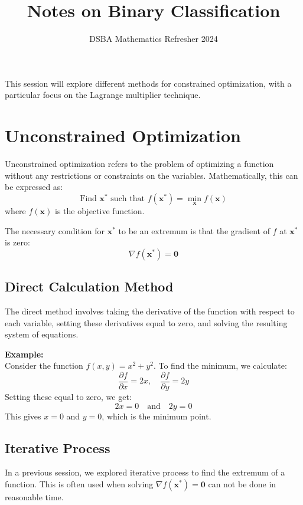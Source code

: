 \documentclass[]{article}
\title{Notes on Binary Classification}
\author{DSBA Mathematics Refresher 2024}
\date{}
\begin{document}
	
	\maketitle
	
	\begin{abstract}
		
	\end{abstract}
	
	This session will explore different methods for constrained optimization, with a particular focus on the Lagrange multiplier technique.
	
	\section{Unconstrained Optimization}
	
	Unconstrained optimization refers to the problem of optimizing a function without any restrictions or constraints on the variables.
	Mathematically, this can be expressed as:
	$$
	\text{Find } \mathbf{x}^* \text{ such that } f(\mathbf{x}^*) = \min_{\mathbf{x}} f(\mathbf{x})
	$$
	where $f(\mathbf{x})$ is the objective function.
	
	The necessary condition for \(\mathbf{x}^*\) to be an extremum is that the gradient of $f$ at $\mathbf{x}^*$ is zero:
	$$
	\nabla f(\mathbf{x}^*) = \mathbf{0}
	$$
	
	\subsection{Direct Calculation Method}
	The direct method involves taking the derivative of the function with respect to each variable, setting these derivatives equal to zero, and solving the resulting system of equations.
	
	\textbf{Example:}
	\noindent\\
	Consider the function $f(x, y) = x^2 + y^2$. To find the minimum, we calculate:
	$$
	\frac{\partial f}{\partial x} = 2x, \quad \frac{\partial f}{\partial y} = 2y
	$$
	Setting these equal to zero, we get:
	$$
	2x = 0 \quad \text{and} \quad 2y = 0
	$$
	This gives $x = 0$ and $y = 0$, which is the minimum point.
	
	\subsection{Iterative Process}
	In a previous session, we explored iterative process to find the extremum of a function.
	This is often used when solving $\nabla f(\mathbf{x}^*) = \mathbf{0}$ can not be done in reasonable time.
	
\end{document}
